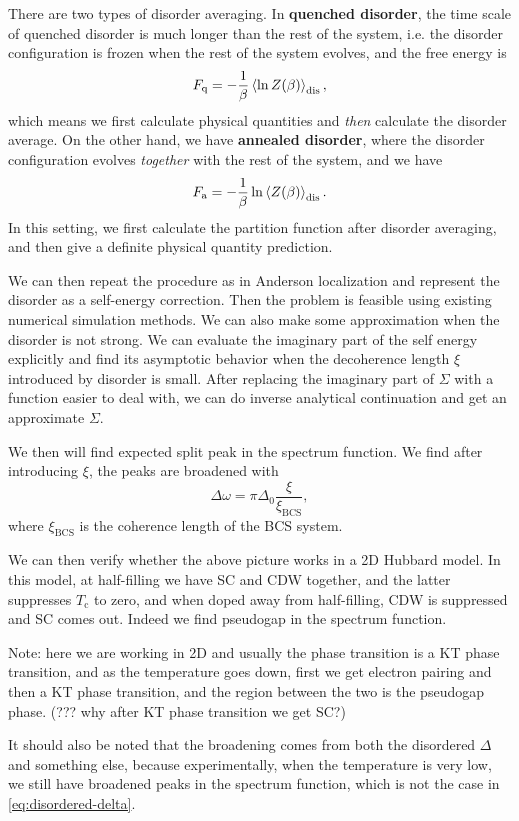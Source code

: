 \documentclass[hyperref, a4paper]{article}
\newcommand*{\concept}[1]{{\textbf{#1}}}
\begin{document}
There are two types of disorder averaging. In \concept{quenched disorder}, the time scale of quenched disorder is 
much longer than the rest of the system, i.e. the disorder configuration is frozen when the rest of the 
system evolves, and the free energy is 
\begin{equation}
    F_\text{q} = - \frac{1}{\beta} \expval{\ln Z(\beta)}_\text{dis},
\end{equation}
which means we first calculate physical quantities and \emph{then} calculate the disorder average.
On the other hand, we have \concept{annealed disorder}, where the disorder configuration evolves \emph{together}
with the rest of the system, and we have 
\begin{equation}
    F_\text{a} = - \frac{1}{\beta} \ln \expval{Z(\beta)}_\text{dis}.
\end{equation}
In this setting, we first calculate the partition function after disorder averaging, and then give a 
definite physical quantity prediction.

We can then repeat the procedure as in Anderson localization and represent the disorder as a self-energy 
correction. Then the problem is feasible using existing numerical simulation methods. 
We can also make some approximation when the disorder is not strong. We can evaluate the imaginary part 
of the self energy explicitly and find its asymptotic behavior when the decoherence length $\xi$ 
introduced by disorder is small. After replacing the imaginary part of $\Sigma$ with a function easier 
to deal with, we can do inverse analytical continuation and get an approximate $\Sigma$.

We then will find expected split peak in the spectrum function. We find after introducing $\xi$, the peaks 
are broadened with 
\begin{equation}
    \Delta \omega = \pi \Delta_0 \frac{\xi}{\xi_\text{BCS}},
\end{equation}
where $\xi_{\text{BCS}}$ is the coherence length of the BCS system. 

We can then verify whether the above picture works in a 2D Hubbard model. In this model, at half-filling 
we have SC and CDW together, and the latter suppresses $T_\text{c}$ to zero, and when doped away from 
half-filling, CDW is suppressed and SC comes out. Indeed we find pseudogap in the spectrum function.

Note: here we are working in 2D and usually the phase transition is a KT phase transition, and as the 
temperature goes down, first we get electron pairing and then a KT phase transition, and the region 
between the two is the pseudogap phase. (??? why after KT phase transition we get SC?)

It should also be noted that the broadening comes from both the disordered $\Delta$ and something else,
because experimentally, when the temperature is very low, we still have broadened peaks in the spectrum 
function, which is not the case in \eqref{eq:disordered-delta}.
\end{document}
